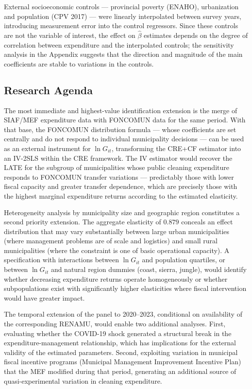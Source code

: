 External socioeconomic controls --- provincial poverty (ENAHO), urbanization and population (CPV 2017) --- were linearly interpolated between survey years, introducing measurement error into the control regressors. Since these controls are not the variable of interest, the effect on $\hat{\beta}$ estimates depends on the degree of correlation between expenditure and the interpolated controls; the sensitivity analysis in the Appendix suggests that the direction and magnitude of the main coefficients are stable to variations in the controls.

\subsection{Research Agenda}
\label{sec:agenda}

The most immediate and highest-value identification extension is the merge of SIAF/MEF expenditure data with FONCOMUN data for the same period. With that base, the FONCOMUN distribution formula --- whose coefficients are set centrally and do not respond to individual municipality decisions --- can be used as an external instrument for $\ln G_{it}$, transforming the CRE+CF estimator into an IV-2SLS within the CRE framework. The IV estimator would recover the LATE for the subgroup of municipalities whose public cleaning expenditure responds to FONCOMUN transfer variations --- predictably those with lower fiscal capacity and greater transfer dependence, which are precisely those with the highest marginal expenditure returns according to the estimated elasticity.

Heterogeneity analysis by municipality size and geographic region constitutes a second priority extension. The aggregate elasticity of $0.879$ conceals an effect distribution that may vary substantially between large urban municipalities (where management problems are of scale and logistics) and small rural municipalities (where the constraint is one of basic operational capacity). A specification with interactions between $\ln G_{it}$ and population quartiles, or between $\ln G_{it}$ and natural region dummies (coast, sierra, jungle), would identify whether decreasing expenditure returns operate homogeneously or whether subpopulations exist with significantly higher elasticities where fiscal intervention would have greater impact.

The temporal extension of the panel to 2020--2023, conditional on availability of the corresponding RENAMU, would enable two additional analyses. First, evaluating whether the COVID-19 shock generated a structural break in the expenditure-management relationship, which has implications for the external validity of the estimated parameters. Second, exploiting variation in municipal fiscal incentive programs (Municipal Management Improvement Incentive Plan) that the MEF modified during that period, generating an additional source of quasi-experimental variation in cleaning expenditure.

